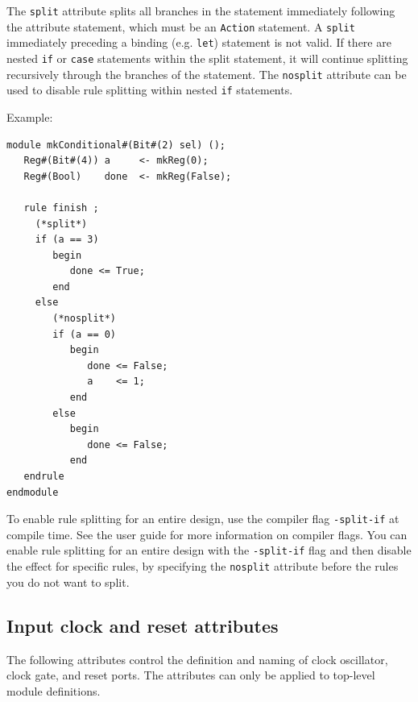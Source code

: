 \documentclass[twoside,letterpaper]{article}
\newcommand{\te}[1]{\texttt{#1}}
\begin{document}
 The \te{split} attribute splits all branches in the statement
immediately  following
the attribute statement, which must be an \te{Action} statement. A
\te{split}  immediately preceding a binding (e.g. \te{let})
statement is not valid. If
there are  nested \te{if} or \te{case} statements
within the split statement, it will continue splitting recursively through the
branches of the statement.  The \te{nosplit} attribute can be used to
disable rule splitting within nested \te{if} statements.


Example:
\begin{verbatim}
module mkConditional#(Bit#(2) sel) ();
   Reg#(Bit#(4)) a     <- mkReg(0);
   Reg#(Bool)    done  <- mkReg(False);

   rule finish ;
     (*split*)
     if (a == 3)
        begin   
           done <= True;
        end
     else
        (*nosplit*)
        if (a == 0)
           begin
              done <= False;
              a    <= 1;
           end
        else
           begin
              done <= False;
           end
   endrule
endmodule
\end{verbatim}

To enable rule splitting for an entire design, use the compiler
flag \te{-split-if} at compile time.  See the user guide for
more information on compiler flags.  You can enable rule splitting for
an entire design with the \te{-split-if} flag and then disable the
effect for specific rules, by specifying the \te{nosplit} attribute
before the rules you do not want to split.


\subsection{Input clock and reset attributes}

The following attributes control the definition and naming of clock
oscillator, clock gate, and reset ports. The attributes can only be applied
to top-level module definitions.
\end{document}
